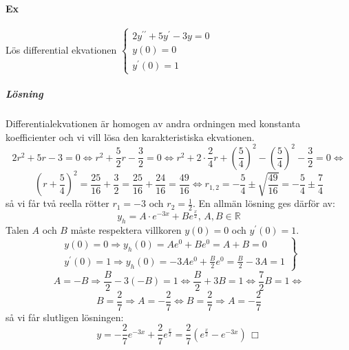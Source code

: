 \paragraph*{Ex} Lös differential ekvationen
$   \left\lbrace
    \begin{matrix}
        2y^{\prime\prime}+5y^\prime-3y=0 \\
        y(0)=0                           \\
        y^\prime(0)=1
    \end{matrix}
    \right.$
\subparagraph*{Lösning}
Differentialekvationen är homogen av andra ordningen med konstanta koefficienter och vi vill lösa den karakteristiska ekvationen.
\begin{equation*}
    2r^2+5r-3=0\Leftrightarrow
    r^2+\frac{5}{2}r-\frac{3}{2}=0\Leftrightarrow
    r^2+2\cdot\frac{2}{4}r+(\frac{5}{4})^2-(\frac{5}{4})^2-\frac{3}{2}=0\Leftrightarrow
\end{equation*}
\begin{equation*}
    (r+\frac{5}{4})^2=
    \frac{25}{16}+\frac{3}{2}=
    \frac{25}{16}+\frac{24}{16}=
    \frac{49}{16}\Leftrightarrow
    r_{1,2}=-\frac{5}{4}\pm\sqrt{\frac{49}{16}}=
    -\frac{5}{4}\pm\frac{7}{4}
\end{equation*}
så vi får två reella rötter $r_1=-3$ och $r_2=\frac{1}{2}$.
En allmän lösning ges därför av:
\begin{equation*}
    y_h=A\cdot e^{-3x}+Be^{\frac{x}{2}},\, A,B\in\mathbb{R}
\end{equation*}
Talen $A$ och $B$ måste respektera villkoren $y(0)=0$ och $y^\prime(0)=1$.
\begin{equation*}
    \left.
    \begin{matrix}
        y(0)=0\Rightarrow y_h(0)=Ae^{0}+Be^{0}=A+B=0 \\
        y^\prime(0)=1\Rightarrow y_h(0)=-3Ae^{0}+\frac{B}{2}e^0=\frac{B}{2}-3A=1
    \end{matrix}
    \right\rbrace
\end{equation*}
\begin{equation*}
    A=-B\Rightarrow\frac{B}{2}-3(-B)=1\Leftrightarrow
    \frac{B}{2}+3B=1\Leftrightarrow
    \frac{7}{2}B=1\Leftrightarrow
\end{equation*}
\begin{equation*}
    B=\frac{2}{7}\Rightarrow
    A=-\frac{2}{7}\Leftrightarrow
    B=\frac{2}{7}\Rightarrow A=-\frac{2}{7}
\end{equation*}
så vi får slutligen lösningen:
\begin{equation*}
    y=-\frac{2}{7}e^{-3x}+\frac{2}{7}e^\frac{x}{2}=\frac{2}{7}(e^\frac{x}{2}-e^{-3x})\, \Box
\end{equation*}
